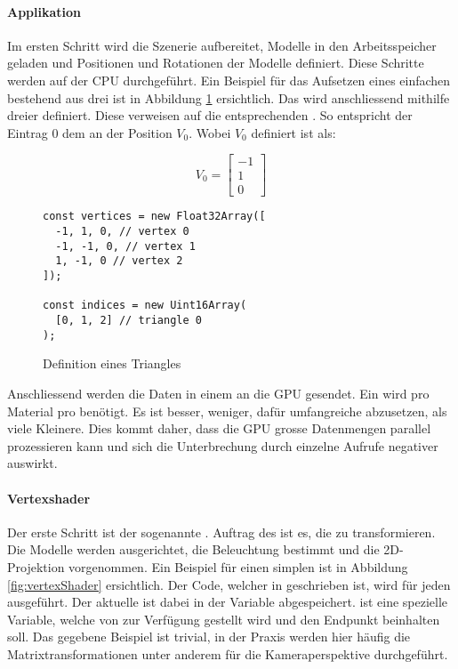 \paragraph{Applikation}
Im ersten Schritt wird die Szenerie aufbereitet, Modelle in den Arbeitsspeicher geladen und Positionen und Rotationen der Modelle definiert. Diese Schritte werden auf der \gls{CPU} durchgeführt. Ein Beispiel für das Aufsetzen eines einfachen  bestehend aus drei  ist in Abbildung \ref{fig:geometryDefinition} ersichtlich. Das  wird anschliessend mithilfe dreier  definiert. Diese  verweisen auf die entsprechenden . So entspricht der Eintrag $0$ dem  an der Position $V_0$. Wobei $V_0$ definiert ist als:

$$
V_0 = \begin{bmatrix}
  -1 \\
  1 \\
  0
\end{bmatrix}
$$

\begin{figure}[H]
\begin{lstlisting}[style=JavaScript]
const vertices = new Float32Array([
  -1, 1, 0, // vertex 0
  -1, -1, 0, // vertex 1
  1, -1, 0 // vertex 2
]);

const indices = new Uint16Array(
  [0, 1, 2] // triangle 0
);
\end{lstlisting}
\caption{Definition eines Triangles}
\label{fig:geometryDefinition}
\end{figure}

Anschliessend werden die Daten in einem  an die \gls{GPU} gesendet. Ein  wird pro Material pro  benötigt. Es ist besser, weniger, dafür umfangreiche  abzusetzen, als viele Kleinere. Dies kommt daher, dass die \gls{GPU} grosse Datenmengen parallel prozessieren kann und sich die Unterbrechung durch einzelne Aufrufe negativer auswirkt.

\paragraph{Vertexshader}
Der erste Schritt ist der sogenannte . Auftrag des  ist es, die  zu transformieren. Die Modelle werden ausgerichtet, die Beleuchtung bestimmt und die 2D-Projektion vorgenommen. Ein Beispiel für einen simplen  ist in Abbildung \ref{fig:vertexShader} ersichtlich. Der Code, welcher in  geschrieben ist, wird für jeden  ausgeführt. Der aktuelle  ist dabei in der Variable  abgespeichert.  ist eine spezielle Variable, welche von  zur Verfügung gestellt wird und den Endpunkt beinhalten soll. Das gegebene Beispiel ist trivial, in der Praxis werden hier häufig die Matrixtransformationen unter anderem für die Kameraperspektive durchgeführt.

